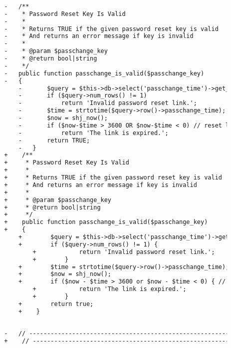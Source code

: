 \begin{lstlisting}[language=diff, caption=Perubahan pada kode User\_model.php]
		
		-	/**
		-	 * Password Reset Key Is Valid
		-	 *
		-	 * Returns TRUE if the given password reset key is valid
		-	 * And returns an error message if key is invalid
		-	 *
		-	 * @param $passchange_key
		-	 * @return bool|string
		-	 */
		-	public function passchange_is_valid($passchange_key)
		-	{
			-		$query = $this->db->select('passchange_time')->get_where('users', array('passchange_key'=>$passchange_key));
			-		if ($query->num_rows() != 1)
			-			return 'Invalid password reset link.';
			-		$time = strtotime($query->row()->passchange_time);
			-		$now = shj_now();
			-		if ($now-$time > 3600 OR $now-$time < 0) // reset link is valid for 1 hour
			-			return 'The link is expired.';
			-		return TRUE;
			-	}
		+    /**
		+     * Password Reset Key Is Valid
		+     *
		+     * Returns TRUE if the given password reset key is valid
		+     * And returns an error message if key is invalid
		+     *
		+     * @param $passchange_key
		+     * @return bool|string
		+     */
		+    public function passchange_is_valid($passchange_key)
		+    {
			+        $query = $this->db->select('passchange_time')->get_where('users', array('passchange_key' => $passchange_key));
			+        if ($query->num_rows() != 1) {
				+            return 'Invalid password reset link.';
				+        }
			+        $time = strtotime($query->row()->passchange_time);
			+        $now = shj_now();
			+        if ($now - $time > 3600 or $now - $time < 0) { // reset link is valid for 1 hour
				+            return 'The link is expired.';
				+        }
			+        return true;
			+    }
		
		
		-	// ------------------------------------------------------------------------
		+    // ------------------------------------------------------------------------
		

\end{lstlisting}
